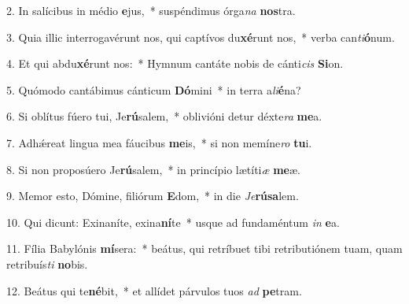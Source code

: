 2. In salícibus in médio \textbf{e}jus,~*  suspéndimus órga\textit{na} \textbf{nos}tra.\

3. Quia illic interrogavérunt nos, qui captívos du\textbf{xé}runt nos,~*  verba can\textit{ti}\textbf{ó}num.\

4. Et qui abdu\textbf{xé}runt nos:~*  Hymnum cantáte nobis de cánti\textit{cis} \textbf{Si}on.\

5. Quómodo cantábimus cánticum \textbf{Dó}mini~*  in terra a\textit{li}\textbf{é}na?\

6. Si oblítus fúero tui, Je\textbf{rú}salem,~*  oblivióni detur déxte\textit{ra} \textbf{me}a.\

7. Adhǽreat lingua mea fáucibus \textbf{me}is,~*  si non memíne\textit{ro} \textbf{tu}i.\

8. Si non proposúero Je\textbf{rú}salem,~*  in princípio lætíti\textit{æ} \textbf{me}æ.\

9. Memor esto, Dómine, filiórum \textbf{E}dom,~*  in die \textit{Je}\textbf{rú}\textbf{sa}lem.\

10. Qui dicunt: Exinaníte, exina\textbf{ní}te~*  usque ad fundaméntum \textit{in} \textbf{e}a.\

11. Fília Babylónis \textbf{mí}sera:~*  beátus, qui retríbuet tibi retributiónem tuam, quam retribuís\textit{ti} \textbf{no}bis.\

12. Beátus qui te\textbf{né}bit,~*  et allídet párvulos tuos \textit{ad} \textbf{pe}tram.\

